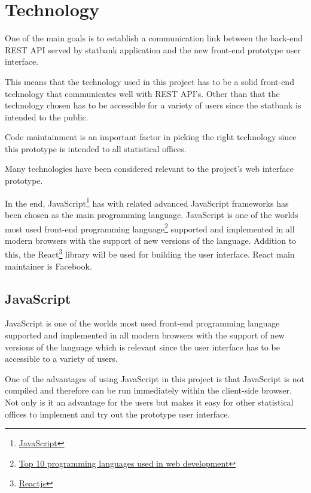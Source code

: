 
\chapter{Technology}
One of the main goals is to establish a communication link between the back-end REST API served by statbank application and the new front-end prototype user interface. 

This means that the technology used in this project has to be a solid front-end technology that communicates well with REST API's. Other than that the technology chosen has to be accessible for a variety of users since the statbank is intended to the public. 

Code maintainment is an important factor in picking the right technology since this prototype is intended to all statistical offices.

Many technologies have been considered relevant to the project's web interface prototype.

In the end, JavaScript\footnote{\href{https://www.javascript.com/}{JavaScript}\label{javascript}} has with related advanced JavaScript frameworks has been chosen as the main programming language. JavaScript is one of the worlds most used front-end programming language\footnote{\href{http://blog.stoneriverelearning.com/top-10-programming-languages-used-in-web-development/}{Top 10 programming languages used in web development}\label{jstop10}} supported and implemented in all modern browsers with the support of new versions of the language. Addition to this, the React\footnote{\href{https://reactjs.org/}{Reactjs}\label{react}} library will be used for building the user interface. React main maintainer is Facebook.

\section{JavaScript}

JavaScript is one of the worlds most used front-end programming language supported and implemented in all modern browsers with the support of new versions of the language which is relevant since the user interface has to be accessible to a variety of users.

One of the advantages of using JavaScript in this project is that JavaScript is not compiled and therefore can be run immediately within the client-side browser. Not only is it an advantage for the users but makes it easy for other statistical offices to implement and try out the prototype user interface.  

